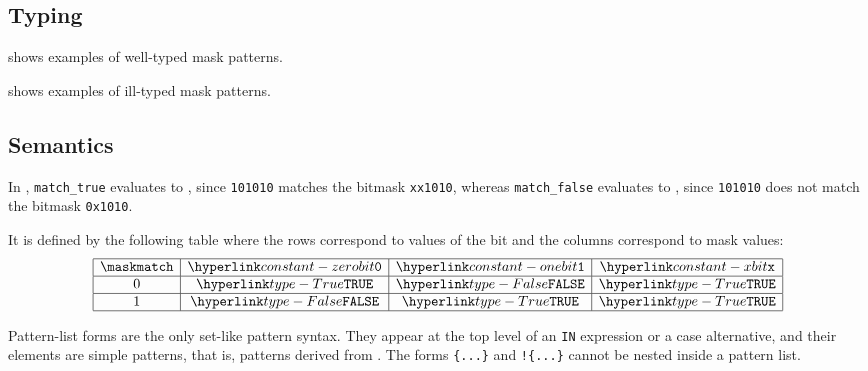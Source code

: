 \subsection{Typing}
 shows examples of well-typed mask patterns.

 shows examples of ill-typed mask patterns.




\subsection{Semantics}
In , \texttt{match\_true} evaluates to \True, since
\texttt{101010} matches the bitmask \texttt{xx1010},
whereas \texttt{match\_false} evaluates to \False, since
\texttt{101010} does not match the bitmask \texttt{0x1010}.

It is defined by the following table where the rows correspond to values of the bit and the columns correspond to mask values:
\[
\begin{array}{|c|c|c|c|}
  \hline
  \maskmatch & \zerobit & \onebit & \xbit\\
  \hline
  0 & \True & \False & \True\\
  \hline
  1 & \False & \True & \True\\
  \hline
\end{array}
\]



Pattern-list forms are the only set-like pattern syntax. They appear at the top level
of an \texttt{IN} expression or a case alternative, and their elements are simple
patterns, that is, patterns derived from \Npattern. The forms \verb|{...}| and
\verb|!{...}| cannot be nested inside a pattern list.

